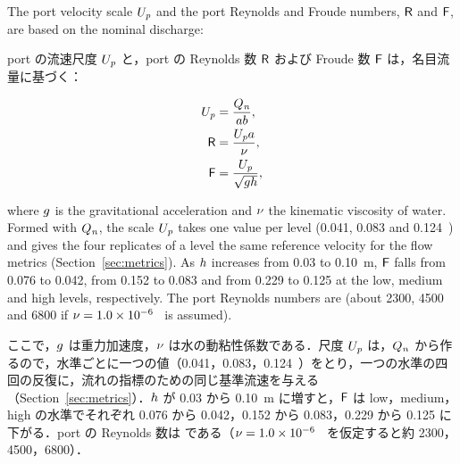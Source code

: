 \begin{en}[M2-4]
The port velocity scale $U_{\mathit{p}}$ and the port Reynolds and Froude numbers, $\mathsf{R}$ and $\mathsf{F}$, are based on the nominal discharge:
\end{en}
\begin{ja}
port の流速尺度 $U_{\mathit{p}}$ と，port の Reynolds 数 $\mathsf{R}$ および Froude 数 $\mathsf{F}$ は，名目流量に基づく：
\end{ja}
\begin{align}
U_{\mathit{p}} &= \frac{Q_{\mathit{n}}}{a b}, \label{eq:Up}\\
\mathsf{R} &= \frac{U_{\mathit{p}} a}{\nu}, \label{eq:Rey}\\
\mathsf{F} &= \frac{U_{\mathit{p}}}{\sqrt{g h}}, \label{eq:Fro}
\end{align}
\begin{en}
where $g$ is the gravitational acceleration and $\nu$ the kinematic viscosity of water. Formed with $Q_{\mathit{n}}$, the scale $U_{\mathit{p}}$ takes one value per level (0.041, 0.083 and 0.124~\mps{}) and gives the four replicates of a level the same reference velocity for the flow metrics (Section~\ref{sec:metrics}). As $h$ increases from 0.03 to 0.10~m, $\mathsf{F}$ falls from 0.076 to 0.042, from 0.152 to 0.083 and from 0.229 to 0.125 at the low, medium and high levels, respectively. The port Reynolds numbers are  (about 2300, 4500 and 6800 if $\nu = 1.0 \times 10^{-6}$~\sqmps{} is assumed).
\end{en}
\begin{ja}
ここで，$g$ は重力加速度，$\nu$ は水の動粘性係数である．尺度 $U_{\mathit{p}}$ は，$Q_{\mathit{n}}$ から作るので，水準ごとに一つの値（0.041，0.083，0.124~\mps{}）をとり，一つの水準の四回の反復に，流れの指標のための同じ基準流速を与える（Section~\ref{sec:metrics}）．$h$ が 0.03 から 0.10~m に増すと，$\mathsf{F}$ は low，medium，high の水準でそれぞれ 0.076 から 0.042，0.152 から 0.083，0.229 から 0.125 に下がる．port の Reynolds 数は  である（$\nu = 1.0 \times 10^{-6}$~\sqmps{} を仮定すると約 2300，4500，6800）．
\end{ja}


